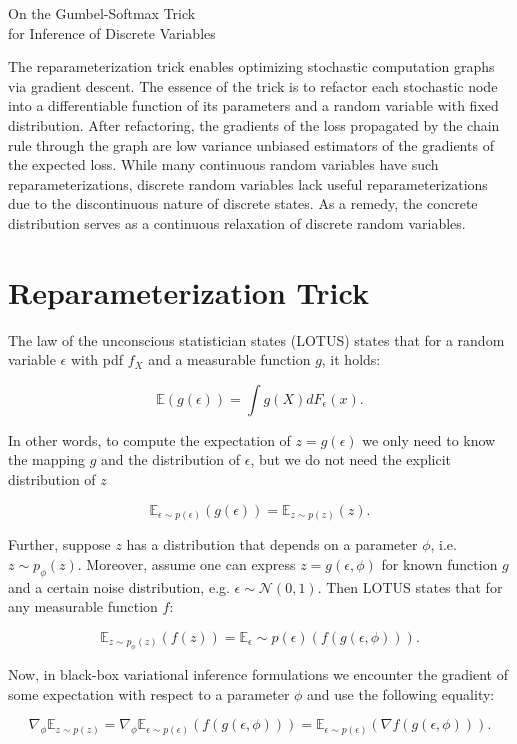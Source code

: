 \documentclass[11pt]{article}
\def\E{\mathbb{E}}
\def\eps{\epsilon}
\begin{document}
\begin{center}
	{\LARGE On the Gumbel-Softmax Trick\\[6pt] for Inference of Discrete Variables} 
\end{center}

The reparameterization trick enables optimizing stochastic computation graphs via gradient descent. The essence of the trick is to refactor each stochastic node into a differentiable function of its parameters and a random variable with fixed distribution. After refactoring, the gradients of the loss propagated by the chain rule through the graph are low variance unbiased estimators of the gradients of the expected loss. While many continuous random variables have such reparameterizations, discrete random variables lack useful reparameterizations due to the discontinuous nature of discrete states. As a remedy, the concrete distribution serves as a continuous relaxation of discrete random variables.

\section{Reparameterization Trick}

The law of the unconscious statistician states (LOTUS) states that for a random variable $\eps$ with pdf $f_X$ and a measurable function $g$, it holds:

\begin{equation}
\E(g(\eps)) = \int g(X) d F_\eps(x).
\end{equation}

In other words, to compute the expectation of $z = g(\eps)$ we only need to know the mapping $g$ and the distribution of $\epsilon$, but we do not need the explicit distribution of $z$

\begin{equation}
\E_{\eps\sim p(\eps)}(g(\eps)) = \E_{z\sim p(z)}(z).
\end{equation}

Further, suppose $z$ has a distribution that depends on a parameter $\phi$, i.e. $z\sim p_\phi (z)$. Moreover, assume one can express $z = g(\eps, \phi)$ for known function $g$ and a certain noise distribution, e.g. $\eps\sim\mathcal{N}(0,1)$. Then LOTUS states that for any measurable function $f$:

\begin{equation}
\E_{z\sim p_\phi (z)}(f(z)) = \E_\eps\sim p(\eps)(f(g(\eps,\phi))).
\end{equation}

Now, in black-box variational inference formulations we encounter the gradient of some expectation with respect to a parameter $\phi$ and use the following equality:

\begin{equation}
\nabla_\phi\E_{z\sim p(z)} = \nabla_\phi\E_{\eps\sim p(\eps)}(f(g(\eps,\phi))) = \E_{\eps\sim p(\eps)}(\nabla f(g(\eps,\phi))).
\end{equation}



 
\end{document}
